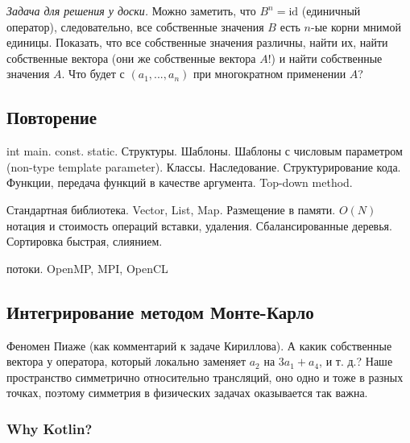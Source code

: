 \documentclass{book}
\begin{document}
\textit{Задача для решения у доски.} Можно заметить, что $B^n = \mathrm{id}$ (единичный оператор), следовательно, все
собственные значения $B$ есть $n$-ые корни мнимой единицы. Показать, что все собственные значения
различны, найти их, найти собственные вектора (они же собственные вектора $A$!) и найти собственные
значения $A$. Что будет с $(a_1, ..., a_n)$ при многократном применении $A$?

\subsection{Повторение}

int main. const. static. Структуры. Шаблоны. Шаблоны с числовым параметром (non-type template parameter). Классы.
Наследование. 
Структурирование кода. Функции, передача функций в качестве аргумента. Top-down method. 

Стандартная библиотека. Vector, List, Map. Размещение в памяти. $O(N)$ нотация и стоимость операций
вставки, удаления. Сбалансированные деревья. Сортировка быстрая, слиянием.

потоки. OpenMP, MPI, OpenCL

\subsection{Интегрирование методом Монте-Карло}

Феномен Пиаже (как комментарий к задаче Кириллова). А какик собственные вектора у оператора,
который локально заменяет $a_2$ на $3 a_1 + a_4$, и т. д.? Наше пространство симметрично
относительно трансляций, оно одно и тоже в разных точках, поэтому симметрия в физических задачах
оказывается так важна.

\subsubsection{Why Kotlin?}
\end{document}
